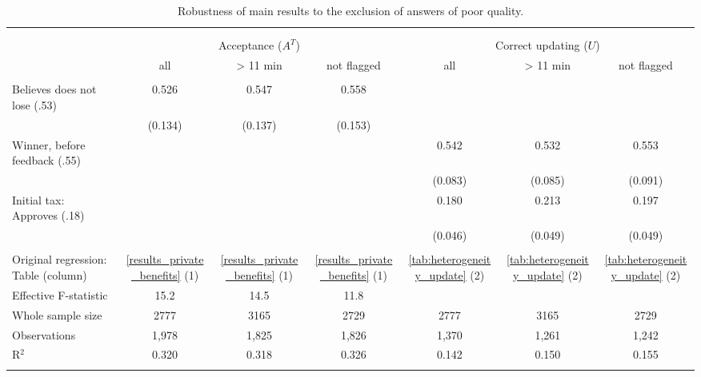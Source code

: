 
\begin{table}[!htbp] \centering 
  \caption{Robustness of main results to the exclusion of answers of poor quality.} 
  \label{tab:7min} 
\begin{tabular}{@{\extracolsep{5pt}}lcccccc} 
\\[-1.8ex]\hline 
\hline \\[-1.8ex] 
\\[-1.8ex] & \multicolumn{3}{c}{Acceptance ($A^T$)} & \multicolumn{3}{c}{Correct updating ($U$)} \\ 
 & all & > 11 min & not flagged & all & > 11 min & not flagged \\ 
\hline \\[-1.8ex] 
 Believes does not lose (.53) & 0.526 & 0.547 & 0.558 &  &  &  \\ 
  & (0.134) & (0.137) & (0.153) &  &  &  \\ 
  Winner, before feedback (.55) &  &  &  & 0.542 & 0.532 & 0.553 \\ 
  &  &  &  & (0.083) & (0.085) & (0.091) \\ 
  Initial tax: Approves (.18) &  &  &  & 0.180 & 0.213 & 0.197 \\ 
  &  &  &  & (0.046) & (0.049) & (0.049) \\ 
 \hline \\[-1.8ex] 
Original regression: Table (column) & \ref{results_private_benefits} (1) & \ref{results_private_benefits} (1) & \ref{results_private_benefits} (1) & \ref{tab:heterogeneity_update} (2) & \ref{tab:heterogeneity_update} (2) & \ref{tab:heterogeneity_update} (2) \\ 
Effective F-statistic & 15.2 & 14.5 & 11.8 &  &  &  \\ 
Whole sample size & 2777 & 3165 & 2729 & 2777 & 3165 & 2729 \\ 
Observations & 1,978 & 1,825 & 1,826 & 1,370 & 1,261 & 1,242 \\ 
R$^{2}$ & 0.320 & 0.318 & 0.326 & 0.142 & 0.150 & 0.155 \\ 
\hline 
\hline \\[-1.8ex] 
\end{tabular} 
\end{table} 
